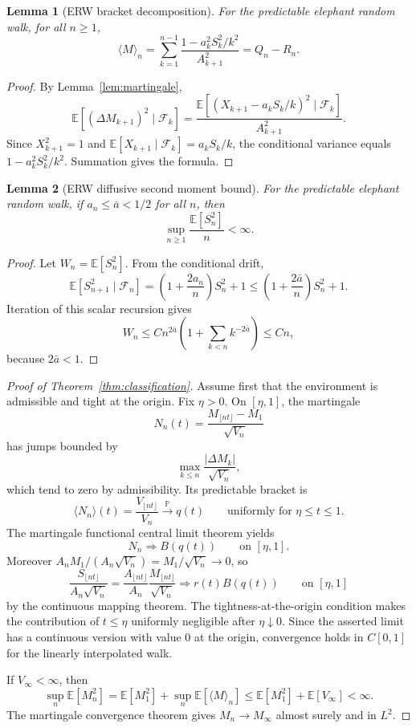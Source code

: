 \documentclass[11pt]{article}
\newtheorem{lemma}{Lemma}
\theoremstyle{definition}
\theoremstyle{remark}
\newcommand{\F}{\mathcal{F}}
\newcommand{\E}{\mathbb{E}}
\newcommand{\Pbb}{\mathbb{P}}
\newcommand{\1}{\mathbf{1}}
\begin{document}
\begin{lemma}[ERW bracket decomposition]\label{lem:bracket-decomposition}
For the predictable elephant random walk, for all \(n\ge1\),
\[
  \langle M\rangle_n
  =
  \sum_{k=1}^{n-1}
  \frac{1-a_k^2S_k^2/k^2}{A_{k+1}^2}
  =
  Q_n-R_n.
\]
\end{lemma}

\begin{proof}
By Lemma~\ref{lem:martingale},
\[
  \E[(\Delta M_{k+1})^2\mid\F_k]
  =
  \frac{\E[(X_{k+1}-a_kS_k/k)^2\mid\F_k]}{A_{k+1}^2}.
\]
Since \(X_{k+1}^2=1\) and
\(\E[X_{k+1}\mid\F_k]=a_kS_k/k\), the conditional variance equals
\(1-a_k^2S_k^2/k^2\). Summation gives the formula.
\end{proof}

\begin{lemma}[ERW diffusive second moment bound]\label{lem:second-moment}
For the predictable elephant random walk, if \(a_n\le \bar a<1/2\) for all
\(n\), then
\[
  \sup_{n\ge1}\frac{\E[S_n^2]}{n}<\infty.
\]
\end{lemma}

\begin{proof}
Let \(W_n=\E[S_n^2]\). From the conditional drift,
\[
  \E[S_{n+1}^2\mid\F_n]
  =
  \left(1+\frac{2a_n}{n}\right)S_n^2+1
  \le
  \left(1+\frac{2\bar a}{n}\right)S_n^2+1.
\]
Iteration of this scalar recursion gives
\[
  W_n\le C n^{2\bar a}
  \left(1+\sum_{k<n}k^{-2\bar a}\right)\le C n,
\]
because \(2\bar a<1\).
\end{proof}

\begin{proof}[Proof of Theorem~\ref{thm:classification}]
Assume first that the environment is admissible and tight at the origin. Fix
\(\eta>0\). On \([\eta,1]\), the martingale
\[
  N_n(t)=\frac{M_{\lfloor nt\rfloor}-M_1}{\sqrt{V_n}}
\]
has jumps bounded by
\[
  \max_{k\le n}\frac{|\Delta M_k|}{\sqrt{V_n}},
\]
which tend to zero by admissibility. Its predictable bracket is
\[
  \langle N_n\rangle(t)
  =
  \frac{V_{\lfloor nt\rfloor}}{V_n}
  \xrightarrow{\Pbb} q(t)
  \qquad\text{uniformly for }\eta\le t\le1.
\]
The martingale functional central limit theorem
\citep[Chapter 3]{hall1980martingale} yields
\[
  N_n\Rightarrow B(q(t))
  \qquad\text{on }[\eta,1].
\]
Moreover \(A_nM_1/(A_n\sqrt{V_n})=M_1/\sqrt{V_n}\to0\), so
\[
  \frac{S_{\lfloor nt\rfloor}}{A_n\sqrt{V_n}}
  =
  \frac{A_{\lfloor nt\rfloor}}{A_n}
  \frac{M_{\lfloor nt\rfloor}}{\sqrt{V_n}}
  \Rightarrow r(t)B(q(t))
  \qquad\text{on }[\eta,1]
\]
by the continuous mapping theorem. The tightness-at-the-origin condition makes
the contribution of \(t\le\eta\) uniformly negligible after \(\eta\downarrow0\).
Since the asserted limit has a continuous version with value \(0\) at the
origin, convergence holds in \(C[0,1]\) for the linearly interpolated walk.

If \(V_\infty<\infty\), then
\[
  \sup_n\E[M_n^2]
  =
  \E[M_1^2]+\sup_n\E[\langle M\rangle_n]
  \le
  \E[M_1^2]+\E[V_\infty]<\infty.
\]
The martingale convergence theorem gives \(M_n\to M_\infty\) almost surely and
in \(L^2\).
\end{proof}
\end{document}
